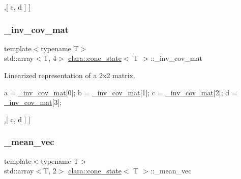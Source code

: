 \begin{DoxyCode}
[ [ a, b ]
 ,[ c, d ] ]
\end{DoxyCode}
 \mbox{\label{classclara_1_1cone__state_af36bb866c831dfc5b7b199d6434511f4}} 
\subsubsection{\texorpdfstring{\+\_\+inv\+\_\+cov\+\_\+mat}{\_inv\_cov\_mat}}
{\footnotesize\ttfamily template$<$typename T$>$ \\
std\+::array$<$T, 4$>$ \hyperlink{classclara_1_1cone__state}{clara\+::cone\+\_\+state}$<$ T $>$\+::\+\_\+inv\+\_\+cov\+\_\+mat}



Linearized representation of a 2x2 matrix. 


\begin{DoxyCode}
a = \hyperlink{classclara_1_1cone__state_af36bb866c831dfc5b7b199d6434511f4}{\_inv\_cov\_mat}[0];
b = \hyperlink{classclara_1_1cone__state_af36bb866c831dfc5b7b199d6434511f4}{\_inv\_cov\_mat}[1];
c = \hyperlink{classclara_1_1cone__state_af36bb866c831dfc5b7b199d6434511f4}{\_inv\_cov\_mat}[2];
d = \hyperlink{classclara_1_1cone__state_af36bb866c831dfc5b7b199d6434511f4}{\_inv\_cov\_mat}[3];
\end{DoxyCode}



\begin{DoxyCode}
[ [ a, b ]
 ,[ c, d ] ]
\end{DoxyCode}
 \mbox{\label{classclara_1_1cone__state_abf600e69be6a3791caefb93b214bb3b5}} 
\subsubsection{\texorpdfstring{\+\_\+mean\+\_\+vec}{\_mean\_vec}}
{\footnotesize\ttfamily template$<$typename T$>$ \\
std\+::array$<$T, 2$>$ \hyperlink{classclara_1_1cone__state}{clara\+::cone\+\_\+state}$<$ T $>$\+::\+\_\+mean\+\_\+vec}




